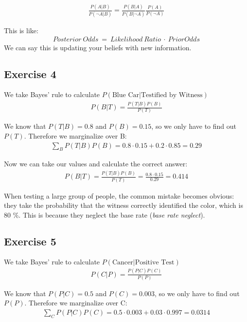 \begin{align*}
\frac{P(A|B)}{P(\neg A|B)} = \frac{P(B|A)}{P(B|\neg A)} \frac{P(A)}{P(\neg A)}
\end{align*}

This is like:
\begin{align*}
Posterior\ Odds\ =\ Likelihood\ Ratio\ \cdot\ Prior Odds
\end{align*}
We can say this is updating your beliefs with new information.


\subsection*{Exercise 4}
We take Bayes' rule to calculate $P(\mbox{Blue Car}|\mbox{Testified by Witness})$
\begin{align*}
P(B|T) = \frac{P(T|B)P(B)}{P(T)}
\end{align*}

We know that $P(T|B) = 0.8$ and $P(B) = 0.15$, so we only have to find out $P(T)$. Therefore we marginalize over B:
\begin{align*}
\sum_{B}{P(T|B)P(B)} = 0.8 \cdot 0.15 + 0.2 \cdot 0.85 = 0.29
\end{align*}

Now we can take our values and calculate the correct answer:
\begin{align*}
P(B|T) = \frac{P(T|B)P(B)}{P(T)} = \frac{0.8 \cdot 0.15}{0.29} = 0.414
\end{align*}

When testing a large group of people, the common mistake becomes obvious: they take the probability that the witness correctly identified the color, which is 80 \%. This is because they neglect the base rate (\textit{base rate neglect}).


\subsection*{Exercise 5}
We take Bayes' rule to calculate $P(\mbox{Cancer}|\mbox{Positive Test})$
\begin{align*}
P(C|P) = \frac{P(P|C)P(C)}{P(P)}
\end{align*}

We know that $P(P|C) = 0.5$ and $P(C) = 0.003$, so we only have to find out $P(P)$. Therefore we marginalize over C:
\begin{align*}
\sum_{C}{P(P|C)P(C)} = 0.5 \cdot 0.003 + 0.03 \cdot 0.997 = 0.0314
\end{align*}

